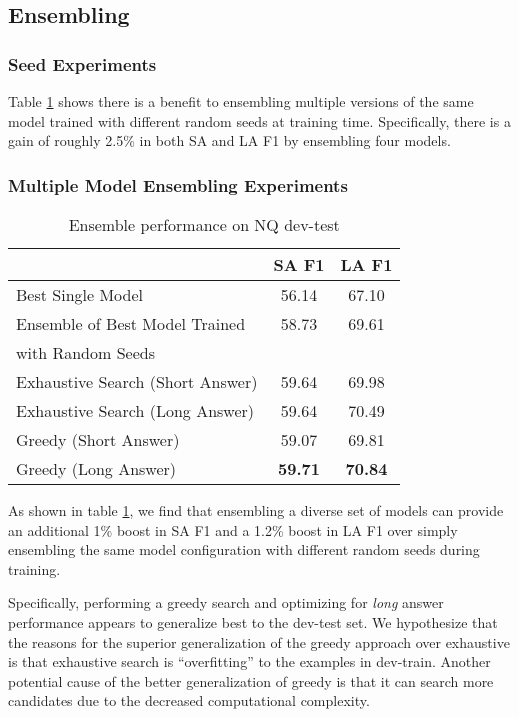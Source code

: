 \documentclass[letterpaper]{article} \usepackage{aaai20}  \usepackage{times}  \usepackage{helvet} \usepackage{courier}  \usepackage[hyphens]{url}  \usepackage{graphicx} \urlstyle{rm} \def\UrlFont{\rm}  \usepackage{graphicx}  \frenchspacing  \setlength{\pdfpagewidth}{8.5in}  \setlength{\pdfpageheight}{11in}  \usepackage{amsmath}
\begin{document}
\subsection{Ensembling}

\subsubsection{Seed Experiments}
Table \ref{tab:exp:ens:search} shows there is a benefit to ensembling multiple versions of the same model trained with different random seeds at training time. Specifically, there is a gain of roughly 2.5\% in both SA and LA F1 by ensembling four models.

\subsubsection{Multiple Model Ensembling Experiments}
\begin{table}[]
\begin{tabular}{lcc}
\toprule
  & SA F1 & LA F1  \\ \toprule
 Best Single Model & 56.14 & 67.10 \\ \toprule
 Ensemble of Best Model Trained & 58.73 & 69.61 \\
 with Random Seeds & & \\ \midrule
 Exhaustive Search (Short Answer) & 59.64 & 69.98   \\ \midrule
 Exhaustive Search (Long Answer) & 59.64 & 70.49   \\ \midrule
 Greedy (Short Answer) & 59.07 & 69.81 \\ \midrule
 Greedy (Long Answer) & \textbf{59.71} & \textbf{70.84}  \\ \bottomrule
\end{tabular}
\caption{Ensemble performance on NQ dev-test}
\label{tab:exp:ens:search}
\end{table}

As shown in table \ref{tab:exp:ens:search}, we find that ensembling a diverse set of models can provide an additional 1\% boost in SA F1 and a 1.2\% boost in LA F1 over simply ensembling the same model configuration with different random seeds during training.

Specifically, performing a greedy search and optimizing for \textit{long} answer performance appears to generalize best to the dev-test set. We hypothesize that the reasons for the superior generalization of the greedy approach over exhaustive is that exhaustive search is ``overfitting'' to the examples in dev-train.  Another potential cause of the better generalization of greedy is that it can search more candidates due to the decreased computational complexity.  
\end{document}
